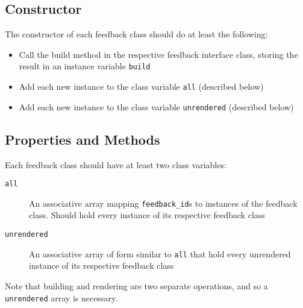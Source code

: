 \documentclass[letterpaper,12pt]{article}
\newcommand{\code}[1]{{\tt #1}}
\begin{document}
\subsection{Constructor}
\label{sec:feedback classes:constructor}
The constructor of each feedback class should do at least the following:
\begin{itemize}
 \item Call the build method in the respective feedback interface class, storing the result in an instance variable \code{build}
 \item Add each new instance to the class variable \code{all} (described below)
 \item Add each new instance to the class variable \code{unrendered} (described below)
\end{itemize}

\subsection{Properties and Methods}
\label{sec:feedback classes:prop and methods}
Each feedback class should have at least two class variables:
\begin{description}
 \item[\code{all}]An associative array mapping \code{feedback\_id}s to instances of the feedback class.  Should hold every instance of its respective feedback class
 \item[\code{unrendered}]An associative array of form similar to \code{all} that hold every unrendered instance of its respective feedback class
\end{description}
\noindent Note that building and rendering are two separate operations, and so a \code{unrendered} array is necessary.
\end{document}

